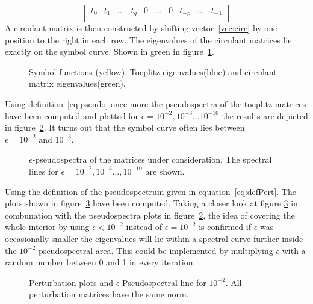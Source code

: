 \begin{equation}
\begin{bmatrix}
t_{0} & t_{1} & \dots & t_{q} & 0 & \dots & 0 & t_{-p} & \dots & t_{-1} \\
\end{bmatrix}
\label{vec:circ}
\end{equation} 
A circulant matrix is then constructed by shifting vector~\ref*{vec:circ} by one position to the right in each row. The eigenvalues of the circulant matrices lie exactly on the symbol curve. Shown in green in figure~\ref{fig:Task2}.
\begin{figure}
\centering
\tikzset{mark size=1}





\caption{Symbol functions (yellow), Toeplitz eigenvalues(blue) and circulant matrix eigenvalues(green).}
\label{fig:Task2}
\end{figure}
Using definition~\ref{eq:pseudo} once more the pseudospectra of the toeplitz matrices have been computed and plotted for $\epsilon = 10^{-2}, 10^{-3} \dots 10^{-10}$ the results are depicted in figure~\ref{fig:Task3No1}. It turns out that the symbol curve often lies between $\epsilon =  10^{-2} \text{ and } 10^{-3}$.
\begin{figure}
\centering
\tikzset{mark size=1}





\caption{$\epsilon$-pseudospectra of the matrices under consideration. The spectral lines for $\epsilon = 10^{-2}, 10^{-3} \dots , 10^{-10}$ are shown.}
\label{fig:Task3No1}
\end{figure}
Using the definition of the pseudospectrum given in equation~\ref{eq:defPert}. The plots shown in figure~\ref{fig:Task3No2} have been computed. Taking a closer look at figure \ref{fig:Task3No2} in combunation with the pseudospectra plots in figure~\ref{fig:Task3No1}, the idea of covering the whole interior by using $\epsilon < 10^{-2}$ instead of $\epsilon = 10^{-2}$ is confirmed if $\epsilon$ was occasionally smaller the eigenvalues will lie within a spectral curve further inside the $10^{-2}$ pseudospectral area. This could be implemented by multiplying $\epsilon$ with a random number between 0 and 1 in every iteration.
\begin{figure}
\centering
\tikzset{mark size=1}




\caption{Perturbation plots and $\epsilon$-Pseudospectral line for $10^{-2}$. All perturbation matrices have the same norm.}
\label{fig:Task3No2}
\end{figure}

